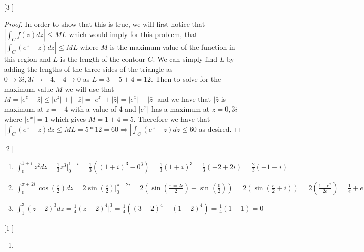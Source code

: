 \documentclass{article}
\theoremstyle{definition}
\begin{document}
\begin{enumerate}
\begin{enumerate}
    \end{enumerate}
    
    \item [[\phantom{-}3]]
    
    \begin{proof}
    In order to show that this is true, we will first notice that $|\int_C f(z)dz| \leq ML$ which would imply for this problem, that $|\int_C (e^z-\bar{z})dz| \leq ML$ where $M$ is the maximum value of the function in this region and $L$ is the length of the contour $C$. We can simply find $L$ by adding the lengths of the three sides of the triangle as $0 \to 3i, 3i \to -4, -4\to 0$ as $L = 3 + 5 + 4 = 12$. Then to solve for the maximum value $M$ we will use that $M = |e^z - \bar{z}| \leq |e^z| + |-\bar{z}| = |e^z| + |\bar{z}| = |e^x| + |\bar{z}|$ and we have that $|\bar{z}$ is maximum at $z = -4$ with a value of $4$ and $|e^x|$ has a maximum at $z = 0, 3i$ where $|e^x| = 1$ which gives $M = 1 + 4 = 5$. Therefore we have that $|\int_C(e^z - \bar{z})dz \leq ML = 5 * 12 = 60 \Rightarrow |\int_C(e^z - \bar{z})dz \leq 60$ as desired.
    \end{proof}
    
    \item [[\phantom{-}2]]
    
    \begin{enumerate}
        \item 
        
        $\int_{0}^{1 + i}z^2dz = \frac{1}{3}z^3|_0^{1 + i} = \frac{1}{3}((1+i)^3 - 0^3) = \frac{1}{3}(1+i)^3 = \frac{1}{3}(-2 + 2i) = \frac{2}{3}(-1 + i)$
        
        \item
        
        $\int_{0}^{\pi + 2i}\cos(\frac{z}{2})dz = 2\sin(\frac{z}{2})|_0^{\pi + 2i} = 2(\sin(\frac{\pi = 2i}{2}) - \sin(\frac{0}{2})) = 2(\sin(\frac{\pi}{2} + i)) = 2(\frac{1 + e^2}{2e}) = \frac{1}{e} + e$
        
        \item
        
        $\int_1^3(z-2)^3dz = \frac{1}{4}(z-2)^4|_1^3 = \frac{1}{4}((3-2)^4-(1-2)^4) = \frac{1}{4}(1-1) = 0$
        
    \end{enumerate}
    
    \item [[\phantom{-}1]]
    
    \begin{enumerate}
        \item 
        

\end{enumerate}
\end{enumerate}
\end{document}
